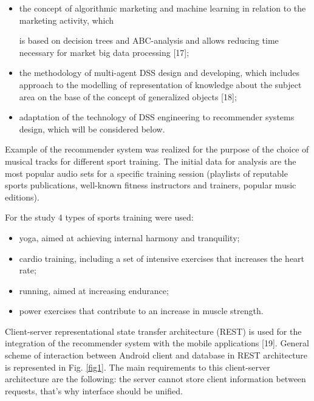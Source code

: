 \documentclass[10pt, a4paper]{article}
\begin{document}
\begin{multicols}{2}
\begin{itemize}[itemsep=0pt, parsep=0pt]
\item the concept of algorithmic marketing and machine
learning in relation to the marketing activity, which

\columnbreak

\noindent is based on decision trees and ABC-analysis and
allows reducing time necessary for market big data
processing [17];

    
    \item the methodology of multi-agent DSS design
and developing, which includes approach to the
modelling of representation of knowledge about the
subject area on the base of the concept of generalized
objects [18];

    \item adaptation of the technology of DSS engineering
to recommender systems design, which will be
considered below.
    
\end{itemize}
\vspace{-0.8em}

Example of the recommender system was realized
for the purpose of the choice of musical tracks for
different sport training. The initial data for analysis are
the most popular audio sets for a specific training session
(playlists of reputable sports publications, well-known
fitness instructors and trainers, popular music editions).\par
For the study 4 types of sports training were used:

\vspace{-0.8em}
\begin{itemize}[itemsep=0pt, parsep=0pt]

    \item yoga, aimed at achieving internal harmony and
tranquility;

    \item cardio training, including a set of intensive exercises
that increases the heart rate;

    \item running, aimed at increasing endurance;

    \item power exercises that contribute to an increase in
muscle strength.
    
\end{itemize}
\vspace{-0.8em}

Client-server representational state transfer architecture
(REST) is used for the integration of the recommender
system with the mobile applications [19]. General scheme
of interaction between Android client and database in
REST architecture is represented in Fig. \ref{fig1}. The main
requirements to this client-server architecture are the
following: the server cannot store client information
between requests, that’s why interface should be unified.


\end{multicols}
\end{document}
